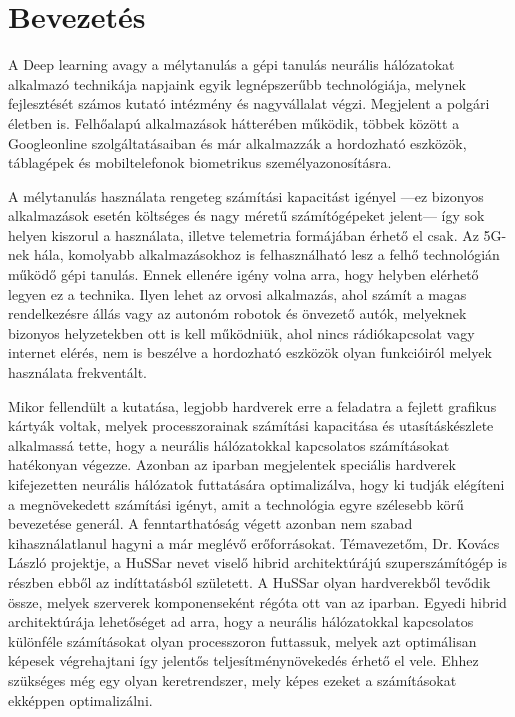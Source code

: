 \chapter*{Bevezetés}
A Deep learning avagy a mélytanulás a gépi tanulás neurális hálózatokat alkalmazó technikája napjaink egyik legnépszerűbb technológiája, melynek fejlesztését számos kutató intézmény és nagyvállalat végzi.
Megjelent a polgári életben is. Felhőalapú alkalmazások hátterében működik, többek között a Google\registeredlogo online szolgáltatásaiban és már alkalmazzák a hordozható eszközök, táblagépek és mobiltelefonok biometrikus személyazonosításra. 

A mélytanulás használata rengeteg számítási kapacitást igényel ---ez bizonyos alkalmazások esetén költséges és nagy méretű számítógépeket jelent--- így sok helyen kiszorul a használata, illetve telemetria formájában érhető el csak.
Az 5G-nek hála, komolyabb alkalmazásokhoz is felhasználható lesz a felhő technológián működő gépi tanulás.
Ennek ellenére igény volna arra, hogy helyben elérhető legyen ez a technika. 
Ilyen lehet az orvosi alkalmazás, ahol számít a magas rendelkezésre állás vagy az autonóm robotok és önvezető autók, melyeknek bizonyos helyzetekben ott is kell működniük, ahol nincs rádiókapcsolat vagy internet elérés, nem is beszélve a hordozható eszközök olyan funkcióiról melyek használata frekventált.

Mikor fellendült a kutatása, legjobb hardverek erre a feladatra a fejlett grafikus kártyák voltak, melyek processzorainak számítási kapacitása és utasításkészlete alkalmassá tette, hogy a neurális hálózatokkal kapcsolatos számításokat hatékonyan végezze.
Azonban az iparban megjelentek speciális hardverek kifejezetten neurális hálózatok futtatására optimalizálva, hogy ki tudják elégíteni a megnövekedett számítási igényt, amit a technológia egyre szélesebb körű bevezetése generál.
A fenntarthatóság végett azonban nem szabad kihasználatlanul hagyni a már meglévő erőforrásokat. Témavezetőm, Dr. Kovács László projektje, a HuSSar nevet viselő hibrid architektúrájú szuperszámítógép is részben ebből az indíttatásból született. A HuSSar olyan hardverekből tevődik össze, melyek szerverek komponenseként régóta ott van az iparban. Egyedi hibrid architektúrája lehetőséget ad arra, hogy a neurális hálózatokkal kapcsolatos különféle számításokat olyan processzoron futtassuk, melyek azt optimálisan képesek végrehajtani így jelentős teljesítménynövekedés érhető el vele.
Ehhez szükséges még egy olyan keretrendszer, mely képes ezeket a számításokat ekképpen optimalizálni.

